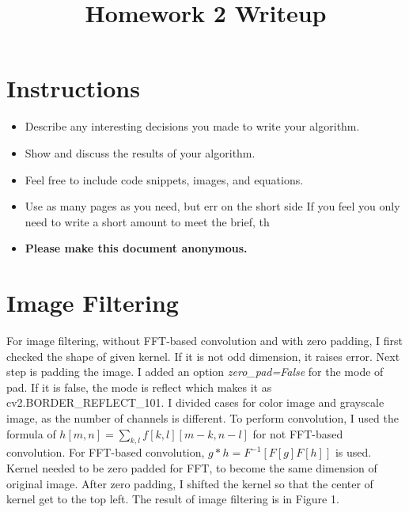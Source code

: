 \title{\vspace{-1cm}Homework 2 Writeup}



\maketitle
\vspace{-3cm}
\thispagestyle{fancy}

\section*{Instructions}
\begin{itemize}
  \item Describe any interesting decisions you made to write your algorithm.
  \item Show and discuss the results of your algorithm.
  \item Feel free to include code snippets, images, and equations.
  \item Use as many pages as you need, but err on the short side If you feel you only need to write a short amount to meet the brief, th
  
  \item \textbf{Please make this document anonymous.}
\end{itemize}

\section*{Image Filtering}

For image filtering, without FFT-based convolution and with zero padding, I first checked the shape of given kernel. If it is not odd dimension, it raises error. Next step is padding the image. I added an option {\it zero\_pad=False} for the mode of pad. If it is false, the mode is reflect which makes it as cv2.BORDER\_REFLECT\_101. I divided cases for color image and grayscale image, as the number of channels is different.
 To perform convolution, I used the formula of $h[m, n] = \sum_{k, l} f[k, l][m - k, n - l]$ for not FFT-based convolution. For FFT-based convolution, $g\ast h = F^{-1}[F[g]F[h]]$ is used. Kernel needed to be zero padded for FFT, to become the same dimension of original image. After zero padding, I shifted the kernel so that the center of kernel get to the top left. 
 The result of image filtering is in Figure 1. 

